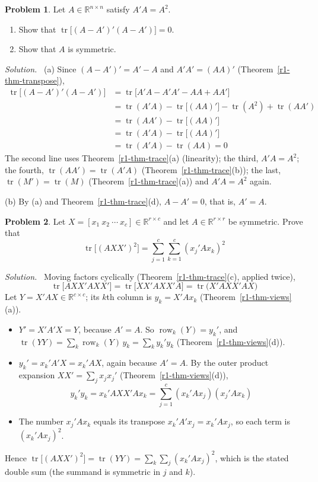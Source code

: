 \documentclass[12pt]{article}
\newcommand{\R}{\mathbb R}
\DeclareMathOperator{\tr}{tr}
\DeclareMathOperator{\row}{row}
\theoremstyle{definition}
\newtheorem{problem}{Problem}
\newenvironment{solution}{\par\noindent\textit{Solution.}\ }{\par\smallskip}
\begin{document}
\begin{problem}\label{r1-ex-ata-a2}
Let \(A\in\R^{n\times n}\) satisfy \(A'A=A^2\).
\begin{enumerate}
\item Show that \(\tr\bigl[(A-A')'(A-A')\bigr]=0\).
\item Show that \(A\) is symmetric.
\end{enumerate}
\end{problem}
\begin{solution}
(a) Since \((A-A')'=A'-A\) and \(A'A'=(AA)'\) (Theorem~\ref{r1-thm-transpose}),
\[
\begin{aligned}
\tr\bigl[(A-A')'(A-A')\bigr]&=\tr\bigl[A'A-A'A'-AA+AA'\bigr]\\
&=\tr(A'A)-\tr\bigl[(AA)'\bigr]-\tr(A^2)+\tr(AA')\\
&=\tr(AA')-\tr\bigl[(AA)'\bigr]\\
&=\tr(A'A)-\tr\bigl[(AA)'\bigr]\\
&=\tr(A'A)-\tr(AA)=0
\end{aligned}
\]
The second line uses Theorem~\ref{r1-thm-trace}(a) (linearity); the third, \(A'A=A^2\); the fourth,
\(\tr(AA')=\tr(A'A)\) (Theorem~\ref{r1-thm-trace}(b)); the last, \(\tr(M')=\tr(M)\) (Theorem~\ref{r1-thm-trace}(a))
and \(A'A=A^2\) again.

(b) By (a) and Theorem~\ref{r1-thm-trace}(d), \(A-A'=0\), that is, \(A'=A\).
\end{solution}

\begin{problem}\label{r1-ex-trace-quadratic}
Let \(X=[x_1\ x_2\ \cdots\ x_c]\in\R^{r\times c}\) and let \(A\in\R^{r\times r}\) be symmetric. Prove that
\[
\tr\bigl[(AXX')^2\bigr]=\sum_{j=1}^c\sum_{k=1}^c(x_j'Ax_k)^2
\]
\end{problem}
\begin{solution}
Moving factors cyclically (Theorem~\ref{r1-thm-trace}(c), applied twice),
\[
\tr\bigl[AXX'AXX'\bigr]=\tr\bigl[XX'AXX'A\bigr]=\tr\bigl(X'AXX'AX\bigr)
\]
Let \(Y=X'AX\in\R^{c\times c}\); its \(k\)th column is \(y_k=X'Ax_k\) (Theorem~\ref{r1-thm-views}(a)).
\begin{itemize}
\item \(Y'=X'A'X=Y\), because \(A'=A\). So \(\row_k(Y)=y_k'\), and \(\tr(YY)=\sum_k\row_k(Y)\,y_k=\sum_ky_k'y_k\)
(Theorem~\ref{r1-thm-views}(d)).
\item \(y_k'=x_k'A'X=x_k'AX\), again because \(A'=A\). By the outer product expansion \(XX'=\sum_jx_jx_j'\)
(Theorem~\ref{r1-thm-views}(d)),
\[
y_k'y_k=x_k'AXX'Ax_k=\sum_{j=1}^c(x_k'Ax_j)(x_j'Ax_k)
\]
\item The number \(x_j'Ax_k\) equals its transpose \(x_k'A'x_j=x_k'Ax_j\), so each term is \((x_k'Ax_j)^2\).
\end{itemize}
Hence \(\tr\bigl[(AXX')^2\bigr]=\tr(YY)=\sum_k\sum_j(x_k'Ax_j)^2\), which is the stated double sum (the summand is
symmetric in \(j\) and \(k\)).
\end{solution}
\end{document}
